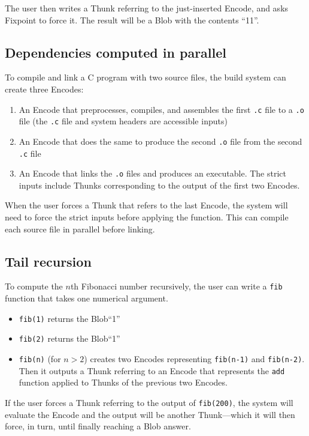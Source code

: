 \documentclass{article}
\newcommand{\blob}{\textrm{Blob}\xspace}
\newcommand{\encode}{\textrm{Encode}\xspace}
\newcommand{\thunk}{\textrm{Thunk}\xspace}
\newcommand{\thunks}{\textrm{Thunk}s\xspace}
\newcommand{\encodes}{\textrm{Encode}s\xspace}
\begin{document}
The user then writes a \thunk referring to the just-inserted \encode,
and asks Fixpoint to force it. The result will be a \blob with the
contents ``11''.

\subsection{Dependencies computed in parallel} To compile and link a C program with two source files,
the build system can create three \encodes:
\begin{enumerate}[itemsep=0pt]
\item An \encode that preprocesses, compiles, and assembles the first \texttt{.c} file to a \texttt{.o} file
  (the \texttt{.c} file and system headers are accessible inputs)
\item An \encode that does the same to produce the second \texttt{.o} file from the second \texttt{.c} file
\item An \encode that links the \texttt{.o} files and produces an executable. The strict inputs include \thunks corresponding to the output of the first two \encodes.
\end{enumerate}

When the user forces a \thunk that refers to the last \encode, the
system will need to force the strict inputs before applying the
function. This can compile each source file in parallel before
linking.

\subsection{Tail recursion} To compute the $n$th Fibonacci number
recursively, the user can write a \texttt{fib} function that
takes one numerical argument.
\begin{itemize}[itemsep=0pt]
\item \texttt{fib(1)} returns the \blob ``1''
\item \texttt{fib(2)} returns the \blob ``1''
  \item \texttt{fib(n)} (for $n>2$) creates two \encodes
    representing \texttt{fib(n-1)} and \texttt{fib(n-2)}.
    Then it outputs a \thunk referring to an \encode that represents
    the \texttt{add} function applied to \thunks of the previous two \encodes.
    \end{itemize}

If the user forces a \thunk referring to the output of \texttt{fib(200)}, the system will
evaluate the \encode and the output will be another \thunk---which it will then force, in turn,
until finally reaching a \blob answer.
\end{document}
